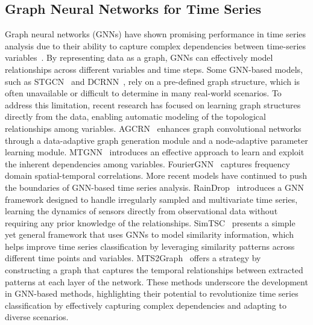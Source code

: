 \vspace{-2.5mm}
\subsection{Graph Neural Networks for Time Series}
Graph neural networks (GNNs) have shown promising performance in time series analysis due to their ability to capture complex dependencies between time-series variables~\cite{gnn_survey_2023}. By representing data as a graph, GNNs can effectively model relationships across different variables and time steps. %
Some GNN-based models, such as STGCN~\cite{YuYZ18} and DCRNN~\cite{LiYS018}, rely on a pre-defined graph structure, which is often unavailable or difficult to determine in many real-world scenarios. To address this limitation, recent research has focused on learning graph structures directly from the data, enabling automatic modeling of the topological relationships among variables. AGCRN~\cite{Bai2020nips} enhances graph convolutional networks through a data-adaptive graph generation module and a node-adaptive parameter learning module. MTGNN~\cite{wu2020connecting} introduces an effective approach to learn and exploit the inherent dependencies among variables. FourierGNN~\cite{yi2024fouriergnn} captures frequency domain spatial-temporal correlations.
More recent models have continued to push the boundaries of GNN-based time series analysis. RainDrop~\cite{ZhangZTZ22} introduces a GNN framework designed to handle irregularly sampled and multivariate time series, learning the dynamics of sensors directly from observational data without requiring any prior knowledge of the relationships. SimTSC~\cite{ZhaLZH22} presents a simple yet general framework that uses GNNs to model similarity information, which helps improve time series classification by leveraging similarity patterns across different time points and variables. MTS2Graph~\cite{YounisHA24} offers a strategy by constructing a graph that captures the temporal relationships between extracted patterns at each layer of the network. 
These methods underscore the development in GNN-based methods, highlighting their potential to revolutionize time series classification by effectively capturing complex dependencies and adapting to diverse scenarios.

